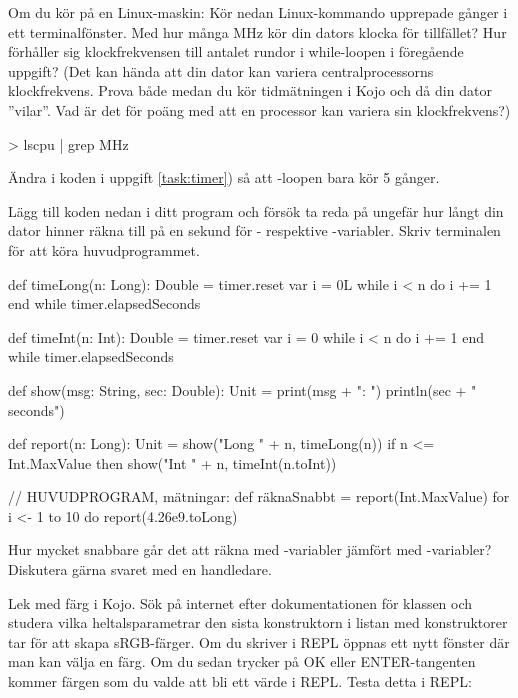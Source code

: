 \Subtask  Om du kör på en Linux-maskin: Kör nedan Linux-kommando upprepade gånger i ett terminalfönster. Med hur många MHz kör din dators klocka för tillfället? Hur förhåller sig klockfrekvensen till antalet rundor i while-loopen i föregående uppgift? (Det kan hända att din dator kan variera centralprocessorns klockfrekvens. Prova både medan du kör tidmätningen i Kojo och då din dator ''vilar''. Vad är det för poäng med att en processor kan variera sin klockfrekvens?)
\begin{REPLnonum}
> lscpu | grep MHz
\end{REPLnonum}


\Subtask Ändra i koden i uppgift \ref{task:timer}) så att -loopen bara kör 5 gånger. %

\Subtask Lägg till koden nedan i ditt program och försök ta reda på ungefär hur långt din dator hinner räkna till på en sekund för - respektive -variabler. Skriv  terminalen för att köra huvudprogrammet.
\begin{CodeSmall}
def timeLong(n: Long): Double =
  timer.reset
  var i = 0L
  while i < n do
    i += 1
  end while
  timer.elapsedSeconds

def timeInt(n: Int): Double =
  timer.reset
  var i = 0
  while i < n do
    i += 1
  end while
  timer.elapsedSeconds

def show(msg: String, sec: Double): Unit =
  print(msg + ": ")
  println(sec + " seconds")

def report(n: Long): Unit =
  show("Long " + n, timeLong(n))
  if n <= Int.MaxValue then
    show("Int  " + n, timeInt(n.toInt))

// HUVUDPROGRAM, mätningar:
def räknaSnabbt =
  report(Int.MaxValue)
  for i <- 1 to 10 do
    report(4.26e9.toLong)
\end{CodeSmall}

\Subtask Hur mycket snabbare går det att räkna med -variabler jämfört med -variabler? Diskutera gärna svaret med en handledare.

\Task Lek med färg i Kojo. Sök på internet efter dokumentationen för klassen  och studera vilka heltalsparametrar den sista konstruktorn i listan med konstruktorer tar för att skapa sRGB-färger.
Om du skriver  i REPL öppnas ett nytt fönster där man kan välja en färg. Om du sedan trycker på OK eller ENTER-tangenten kommer färgen som du valde att bli ett värde i REPL.
Testa detta i REPL:

